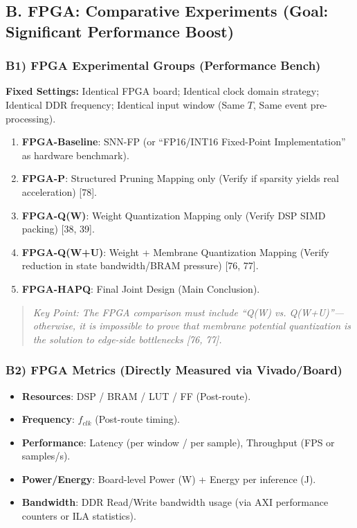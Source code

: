 \documentclass[10pt,a4paper]{article}
\begin{document}
\subsection{B. FPGA: Comparative Experiments (Goal: Significant Performance Boost)}

\subsubsection{B1) FPGA Experimental Groups (Performance Bench)}
\textbf{Fixed Settings:} Identical FPGA board; Identical clock domain strategy; Identical DDR frequency; Identical input window (Same $T$, Same event pre-processing).

\begin{enumerate}
    \item \textbf{FPGA-Baseline}: SNN-FP (or ``FP16/INT16 Fixed-Point Implementation'' as hardware benchmark).
    \item \textbf{FPGA-P}: Structured Pruning Mapping only (Verify if sparsity yields real acceleration) [78].
    \item \textbf{FPGA-Q(W)}: Weight Quantization Mapping only (Verify DSP SIMD packing) [38, 39].
    \item \textbf{FPGA-Q(W+U)}: Weight + Membrane Quantization Mapping (Verify reduction in state bandwidth/BRAM pressure) [76, 77].
    \item \textbf{FPGA-HAPQ}: Final Joint Design (Main Conclusion).
\end{enumerate}

\begin{quote}
    \textit{Key Point: The FPGA comparison must include ``Q(W) vs. Q(W+U)''—otherwise, it is impossible to prove that membrane potential quantization is the solution to edge-side bottlenecks [76, 77].}
\end{quote}

\subsubsection{B2) FPGA Metrics (Directly Measured via Vivado/Board)}
\begin{itemize}
    \item \textbf{Resources}: DSP / BRAM / LUT / FF (Post-route).
    \item \textbf{Frequency}: $f_{clk}$ (Post-route timing).
    \item \textbf{Performance}: Latency (per window / per sample), Throughput (FPS or samples/s).
    \item \textbf{Power/Energy}: Board-level Power (W) + Energy per inference (J).
    \item \textbf{Bandwidth}: DDR Read/Write bandwidth usage (via AXI performance counters or ILA statistics).
\end{itemize}
\end{document}
